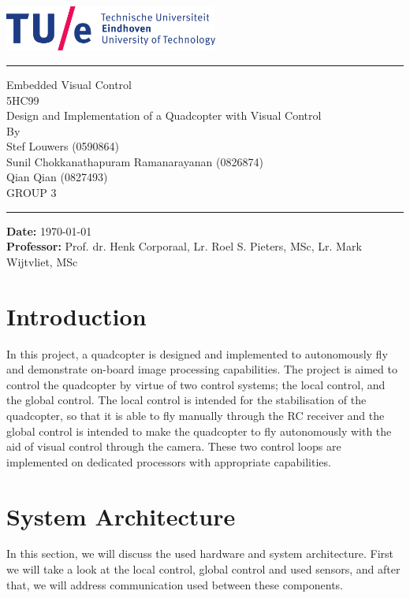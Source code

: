 \documentclass[11pt, a4paper, onecolumn, oneside, parskip=half]{scrartcl}
\newcommand{\authors}{\\Stef Louwers (0590864)\\
Sunil Chokkanathapuram Ramanarayanan (0826874)\\
Qian Qian (0827493)\\
GROUP 3
} %
\newcommand{\prof}{Prof. dr. Henk Corporaal, Lr. Roel S. Pieters, MSc, Lr. Mark Wijtvliet, MSc} %
\newcommand{\doctitle}{Design and Implementation of a Quadcopter with Visual Control} %
\newcommand{\subcode}{5HC99} %
\newcommand{\docsubject}{Embedded Visual Control} %
\newcommand{\HRule}[2]{\noindent\rule[#1]{\linewidth}{#2}}
\newcommand{\vlinespace}[1]{\vspace*{#1\baselineskip}}
\begin{document}
\begin{titlepage}

\sffamily
\hfill \centering
\includegraphics[width=7cm]{tuelogo}
\HRule{11pt}{2pt}

\vfill
\Large{\docsubject{} \\\subcode{} \\}
\vlinespace{1}
\huge{\doctitle{}\\}
\vlinespace{8}
\vfill
\large
By \authors{}\\
\vfill
\HRule{11pt}{2pt}
\raggedright
\textbf{Date: } \today \\
\textbf{Professor:} \prof{}

\end{titlepage}

\tableofcontents
\newpage
\pagestyle{scrheadings}

\section{Introduction}
In this project, a quadcopter is designed and implemented to autonomously fly and demonstrate on-board image processing capabilities. The project is aimed to control the quadcopter by virtue of two control systems; the local control, and the global control. The local control is intended for the stabilisation of the quadcopter, so that it is able to fly manually through the RC receiver and the global control is intended to make the quadcopter to fly autonomously with the aid of visual control through the camera. These two control loops are implemented on dedicated processors with appropriate capabilities.


\section{System Architecture}
\label{sec:arch}
In this section, we will discuss the used hardware and system architecture. First we will take a look at the local control, global control and used sensors, and after that, we will address communication used between these components.
\end{document}
